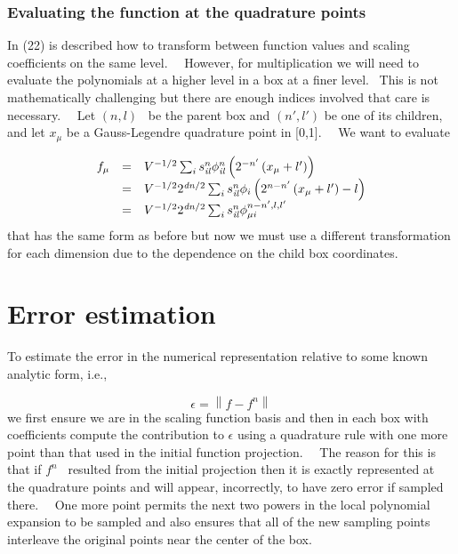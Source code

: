 \documentclass[letterpaper]{article}
\begin{document}
\subsubsection[Evaluating the function at the quadrature points]{\rmfamily Evaluating the function at the quadrature
points}
In (22) is described how to transform between function values and scaling coefficients on the same level. \ \ However,
for multiplication we will need to evaluate the polynomials at a higher level in a box at a finer level. \ This is not
mathematically challenging but there are enough indices involved that care is necessary. \ \ Let  $(n,l)$ \ be the
parent box and  $(n',l')$ be one of its children, and let  $x_{\mu }$ be a Gauss-Legendre quadrature point in [0,1].
\ \ We want to evaluate 

\begin{equation}\label{seq:refText43}
\begin{matrix}f_{\mu }&\text{=}&V^{-1/2}\sum _{i}{s_{\mathit{il}}^{n}\phi _{\mathit{il}}^{n}\left(2^{-n'}\left(x_{\mu
}+l'\right)\right)}\hfill\null \\&\text{=}&V^{-1/2}2^{\mathit{dn}/2}\sum _{i}{s_{\mathit{il}}^{n}\phi
_{i}\left(2^{n-n'}\left(x_{\mu }+l'\right)-l\right)}\hfill\null \\&\text{=}&V^{-1/2}2^{\mathit{dn}/2}\sum
_{i}{s_{\mathit{il}}^{n}\phi _{\mu i}^{n-n',l,l'}}\hfill\null \end{matrix}
\end{equation}
that has the same form as before but now we must use a different transformation for each dimension due to the dependence
on the child box coordinates.

\section{Error estimation}
To estimate the error in the numerical representation relative to some known analytic form, i.e., 

\begin{equation}
\epsilon =\left\|f-f^{n}\right\|
\end{equation}
we first ensure we are in the scaling function basis and then in each box with coefficients compute the contribution to 
$\epsilon $ using a quadrature rule with one more point than that used in the initial function projection. \ \ The
reason for this is that if  $f^{n}$ \ resulted from the initial projection then it is exactly represented at the
quadrature points and will appear, incorrectly, to have zero error if sampled there. \ \ One more point permits the
next two powers in the local polynomial expansion to be sampled and also ensures that all of the new sampling points
interleave the original points near the center of the box. \ 
\end{document}
